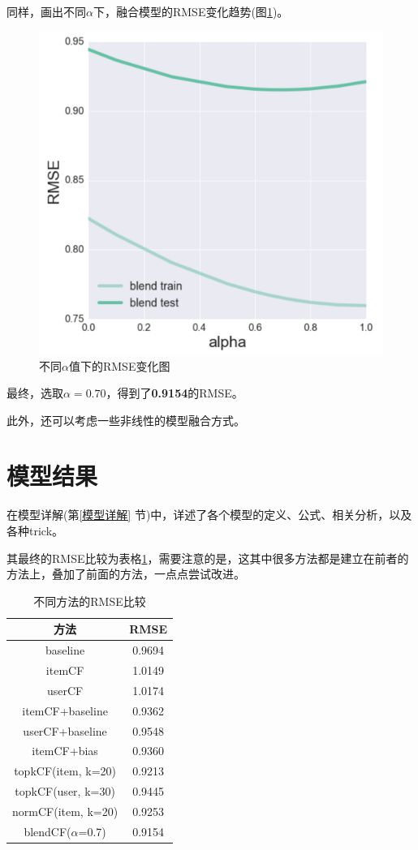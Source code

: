 \documentclass[utf8, a4paper,11pt, onecolumn]{ctexart}
\begin{document}
\begin{spacing}{1.3}
同样，画出不同$\alpha$下，融合模型的RMSE变化趋势(图\ref{alpha-figure})。

\begin{figure}[ht]
	\centering
	\includegraphics[width=0.8\linewidth]{alpha-figure.png}
	\caption{不同$\alpha$值下的RMSE变化图}
	\label{alpha-figure}
\end{figure}

最终，选取$\alpha = 0.70$，得到了\textbf{0.9154}的RMSE。

此外，还可以考虑一些非线性的模型融合方式。

\section{模型结果}

在模型详解(第\ref{模型详解} 节)中，详述了各个模型的定义、公式、相关分析，以及各种trick。

其最终的RMSE比较为表格\ref{RMSE-table}，需要注意的是，这其中很多方法都是建立在前者的方法上，叠加了前面的方法，一点点尝试改进。

\begin{table}[h]
	\centering
	\begin{tabular}{|c|c|}
		\hline
		\textbf{方法} & \textbf{RMSE} \\
		\hline
		baseline &   0.9694 \\
		\hline
		itemCF &  1.0149 \\
		\hline
		userCF & 1.0174 \\
		\hline
		itemCF+baseline &  0.9362 \\
		\hline
		userCF+baseline & 0.9548 \\
		\hline
		itemCF+bias & 0.9360 \\
		\hline
		topkCF(item, k=20) & 0.9213 \\
		\hline
		topkCF(user, k=30) &0.9445 \\
		\hline
		normCF(item, k=20) &0.9253 \\
		\hline
		blendCF($\alpha$=0.7) & 0.9154 \\		
		\hline
	\end{tabular}
	\caption{不同方法的RMSE比较}
	\label{RMSE-table}
\end{table}


\end{spacing}
\end{document}
